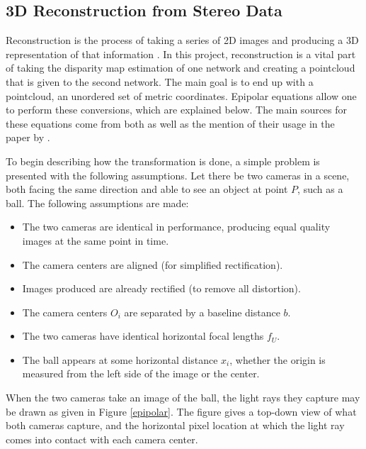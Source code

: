 \subsection{3D Reconstruction from Stereo Data}
\label{sect_reconstruct}
Reconstruction is the process of taking a series of 2D images and producing a 3D representation of that information \cite{szeliski_computer_2010}. In this project, reconstruction is a vital part of taking the disparity map estimation of one network and creating a pointcloud that is given to the second network. The main goal is to end up with a pointcloud, an unordered set of metric coordinates. Epipolar equations allow one to perform these conversions, which are explained below. The main sources for these equations come from both \cite{szeliski_computer_2010} as well as the mention of their usage in the paper by \cite{wang_pseudo-lidar_2019}. 

To begin describing how the transformation is done, a simple problem is presented with the following assumptions. Let there be two cameras in a scene, both facing the same direction and able to see an object at point $P$, such as a ball. The following assumptions are made: 

\begin{itemize} \itemsep=-0.5em
	\item The two cameras are identical in performance, producing equal quality images at the same point in time.
	\item The camera centers are aligned (for simplified rectification).
	\item Images produced are already rectified (to remove all distortion).
	\item The camera centers $O_i$ are separated by a baseline distance $b$.
	\item The two cameras have identical horizontal focal lengths $f_U$.
	\item The ball appears at some horizontal distance $x_i$, whether the origin is measured from the left side of the image or the center.
\end{itemize}

When the two cameras take an image of the ball, the light rays they capture may be drawn as given in Figure \ref{epipolar}. The figure gives a top-down view of what both cameras capture, and the horizontal pixel location at which the light ray comes into contact with each camera center. 


